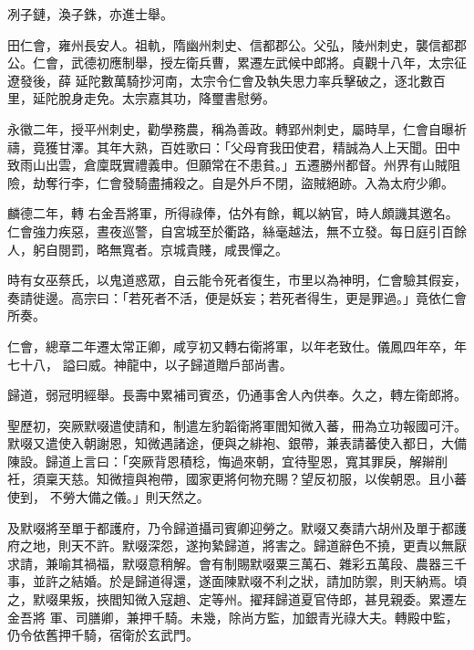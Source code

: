 \begin{pinyinscope}
 冽子鏈，渙子銖，亦進士舉。



 田仁會，雍州長安人。祖軌，隋幽州刺史、信都郡公。父弘，陵州刺史，襲信都郡公。仁會，武德初應制舉，授左衛兵曹，累遷左武候中郎將。貞觀十八年，太宗征遼發後，薛
 延陀數萬騎抄河南，太宗令仁會及執失思力率兵擊破之，逐北數百里，延陀脫身走免。太宗嘉其功，降璽書慰勞。



 永徽二年，授平州刺史，勸學務農，稱為善政。轉郢州刺史，屬時旱，仁會自曝祈禱，竟獲甘澤。其年大熟，百姓歌曰：「父母育我田使君，精誠為人上天聞。田中致雨山出雲，倉廩既實禮義申。但願常在不患貧。」五遷勝州都督。州界有山賊阻險，劫奪行李，仁會發騎盡捕殺之。自是外戶不閉，盜賊絕跡。入為太府少卿。



 麟德二年，轉
 右金吾將軍，所得祿俸，估外有餘，輒以納官，時人頗譏其邀名。仁會強力疾惡，晝夜巡警，自宮城至於衢路，絲毫越法，無不立發。每日庭引百餘人，躬自閱罰，略無寬者。京城貴賤，咸畏憚之。



 時有女巫蔡氏，以鬼道惑眾，自云能令死者復生，市里以為神明，仁會驗其假妄，奏請徙邊。高宗曰：「若死者不活，便是妖妄；若死者得生，更是罪過。」竟依仁會所奏。



 仁會，總章二年遷太常正卿，咸亨初又轉右衛將軍，以年老致仕。儀鳳四年卒，年七十八，
 謚曰威。神龍中，以子歸道贈戶部尚書。



 歸道，弱冠明經舉。長壽中累補司賓丞，仍通事舍人內供奉。久之，轉左衛郎將。



 聖歷初，突厥默啜遣使請和，制遣左豹韜衛將軍閻知微入蕃，冊為立功報國可汗。默啜又遣使入朝謝恩，知微遇諸途，便與之緋袍、銀帶，兼表請蕃使入都日，大備陳設。歸道上言曰：「突厥背恩積稔，悔過來朝，宜待聖恩，寬其罪戾，解辮削衽，須稟天慈。知微擅與袍帶，國家更將何物充賜？望反初服，以俟朝恩。且小蕃使到，
 不勞大備之儀。」則天然之。



 及默啜將至單于都護府，乃令歸道攝司賓卿迎勞之。默啜又奏請六胡州及單于都護府之地，則天不許。默啜深怨，遂拘縶歸道，將害之。歸道辭色不撓，更責以無厭求請，兼喻其禍福，默啜意稍解。會有制賜默啜粟三萬石、雜彩五萬段、農器三千事，並許之結婚。於是歸道得還，遂面陳默啜不利之狀，請加防禦，則天納焉。頃之，默啜果叛，挾閻知微入寇趙、定等州。擢拜歸道夏官侍郎，甚見親委。累遷左金吾將
 軍、司膳卿，兼押千騎。未幾，除尚方監，加銀青光祿大夫。轉殿中監，仍令依舊押千騎，宿衛於玄武門。




\end{pinyinscope}
